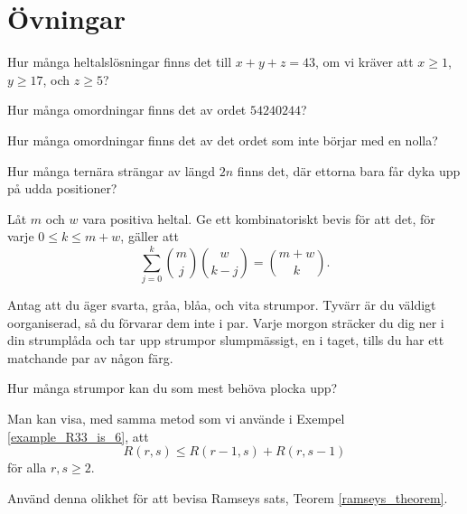 \documentclass[nobib]{tufte-handout}
\begin{document}
\section{Övningar}

\begin{xca}
  Hur många heltalslösningar finns det till $x + y + z = 43$, om vi kräver att $x \geq 1$, $y \geq 17$, och $z \geq 5$?
\end{xca}

\begin{xca}
  Hur många omordningar finns det av ordet $54240244$?

  Hur många omordningar finns det av det ordet som inte börjar med en nolla?
\end{xca}

\begin{xca}
  Hur många ternära strängar av längd $2n$ finns det, där ettorna bara får dyka upp på udda positioner?
\end{xca}

\begin{xca}
  Låt $m$ och $w$ vara positiva heltal. Ge ett kombinatoriskt bevis för att det, för varje $0 \leq k \leq m + w$, gäller att
  $$\sum_{j=0}^k \binom{m}{j}\binom{w}{k-j} = \binom{m + w}{k}.$$
\end{xca}

\begin{xca}
  Antag att du äger svarta, gråa, blåa, och vita strumpor. Tyvärr är du väldigt oorganiserad, så du förvarar dem inte i par. Varje morgon sträcker du dig ner i din strumplåda och tar upp strumpor slumpmässigt, en i taget, tills du har ett matchande par av någon färg.

  Hur många strumpor kan du som mest behöva plocka upp?
\end{xca}

\begin{xca}
  Man kan visa, med samma metod som vi använde i Exempel \ref{example_R33_is_6}, att
  $$R(r,s) \leq R(r-1,s) + R(r, s-1)$$
  för alla $r, s \geq 2$.

  Använd denna olikhet för att bevisa Ramseys sats, Teorem \ref{ramseys_theorem}.
\end{xca}

%
%
\end{document}
